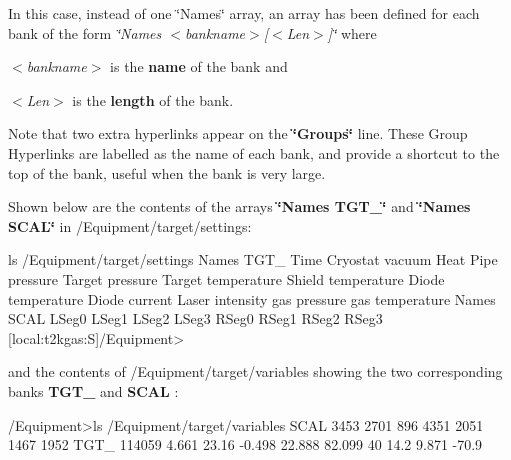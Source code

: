 In this case, instead of one \char`\"{}Names\char`\"{} array, an array has been defined for each bank of the form {\itshape \char`\"{}Names  $<$bankname$>$\mbox{[}$<$Len$>$\mbox{]}\char`\"{}\/} where
\begin{DoxyItemize}
\item {\itshape $<$bankname$>$\/} is the {\bfseries name} of the bank and
\item {\itshape $<$Len$>$\/} is the {\bfseries length} of the bank.
\end{DoxyItemize}

Note that two extra hyperlinks appear on the {\bfseries \char`\"{}Groups\char`\"{}} line. These Group Hyperlinks are labelled as the name of each bank, and provide a shortcut to the top of the bank, useful when the bank is very large.

Shown below are the contents of the arrays {\bfseries  \char`\"{}Names TGT\_\-\char`\"{} }and {\bfseries \char`\"{}Names SCAL\char`\"{}} in /Equipment/target/settings: 
\begin{DoxyCode}
ls /Equipment/target/settings
Names TGT_
                                Time
                                Cryostat vacuum
                                Heat Pipe pressure
                                Target pressure
                                Target temperature
                                Shield temperature
                                Diode temperature
                                Diode current
                                Laser intensity
                                gas pressure
                                gas temperature
Names SCAL
                                LSeg0
                                LSeg1
                                LSeg2
                                LSeg3
                                RSeg0
                                RSeg1
                                RSeg2
                                RSeg3
[local:t2kgas:S]/Equipment>
\end{DoxyCode}
 and the contents of /Equipment/target/variables showing the two corresponding banks {\bfseries TGT\_\-} and {\bfseries SCAL} : 
\begin{DoxyCode}
/Equipment>ls /Equipment/target/variables
SCAL
                                3453
                                2701
                                896
                                4351
                                2051
                                1467
                                1952
TGT_
                                114059
                                4.661
                                23.16
                                -0.498
                                22.888
                                82.099
                                40
                                14.2
                                9.871
                                -70.9
\end{DoxyCode}


